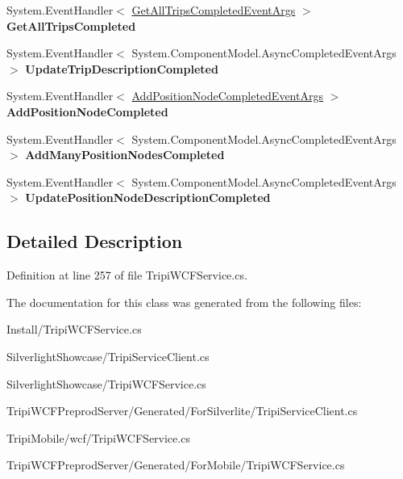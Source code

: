 \begin{DoxyCompactItemize}
\item 
\hypertarget{class_trip_service_client_a1e81f3767272794d7b73fe9f00c61749}{
System.EventHandler$<$ \hyperlink{class_get_all_trips_completed_event_args}{GetAllTripsCompletedEventArgs} $>$ {\bfseries GetAllTripsCompleted}}
\label{class_trip_service_client_a1e81f3767272794d7b73fe9f00c61749}

\item 
\hypertarget{class_trip_service_client_ad4e4fdf7e6426b686d4a5ccaf1d5e969}{
System.EventHandler$<$ System.ComponentModel.AsyncCompletedEventArgs $>$ {\bfseries UpdateTripDescriptionCompleted}}
\label{class_trip_service_client_ad4e4fdf7e6426b686d4a5ccaf1d5e969}

\item 
\hypertarget{class_trip_service_client_a3055e4a19ef8b5a861dfc1cab7da07bd}{
System.EventHandler$<$ \hyperlink{class_add_position_node_completed_event_args}{AddPositionNodeCompletedEventArgs} $>$ {\bfseries AddPositionNodeCompleted}}
\label{class_trip_service_client_a3055e4a19ef8b5a861dfc1cab7da07bd}

\item 
\hypertarget{class_trip_service_client_a49f34a80f6caae1409a662207241d08a}{
System.EventHandler$<$ System.ComponentModel.AsyncCompletedEventArgs $>$ {\bfseries AddManyPositionNodesCompleted}}
\label{class_trip_service_client_a49f34a80f6caae1409a662207241d08a}

\item 
\hypertarget{class_trip_service_client_a7732c4aedd9f63f71cd5bc6e4c4b3b40}{
System.EventHandler$<$ System.ComponentModel.AsyncCompletedEventArgs $>$ {\bfseries UpdatePositionNodeDescriptionCompleted}}
\label{class_trip_service_client_a7732c4aedd9f63f71cd5bc6e4c4b3b40}

\end{DoxyCompactItemize}


\subsection{Detailed Description}


Definition at line 257 of file TripiWCFService.cs.

The documentation for this class was generated from the following files:\begin{DoxyCompactItemize}
\item 
Install/TripiWCFService.cs\item 
SilverlightShowcase/TripiServiceClient.cs\item 
SilverlightShowcase/TripiWCFService.cs\item 
TripiWCFPreprodServer/Generated/ForSilverlite/TripiServiceClient.cs\item 
TripiMobile/wcf/TripiWCFService.cs\item 
TripiWCFPreprodServer/Generated/ForMobile/TripiWCFService.cs\end{DoxyCompactItemize}
